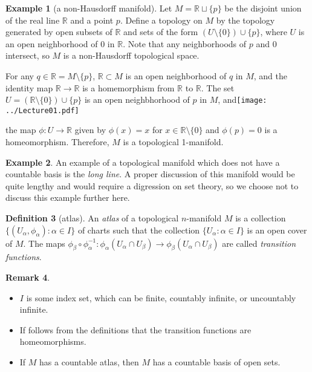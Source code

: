 \documentclass{amsart}
\numberwithin{equation}{section}
\newcommand{\bR}{\mathbb{R}}
\theoremstyle{definition}
\newtheorem{definition}{Definition} [section]
\newtheorem{example}[definition]{Example}
\newtheorem{remark}[definition]{Remark}
\theoremstyle{theorem}
\begin{document}
\begin{example}[a non-Hausdorff manifold]
Let $M = \mathbb{R} \sqcup \{p\}$ be the disjoint union of the real line $\bR$ and a point $p$. 
Define a topology on $M$ by the topology generated by open subsets of $\bR$ and sets
of the form $(U\setminus\{0\})\cup \{p\}$, where $U$ is an open neighborhood of 
$0$ in $\bR$.   Note that any neighborhoods of $p$ and   $0$ intersect, so $M$ is a non-Hausdorff topological space.

For any $q\in \bR = M\setminus\{p\}$, $\bR\subset M$ is an open neighborhood of $q$ in $M$, and 
the identity map $\bR\to \bR$ is a homemorphism from $\bR$ to $\bR$. The
set $U= (\bR\setminus \{0\})\cup \{ p\}$ is an open neighbhorhood of $p$ in $M$, and\texttt{[image: ../Lecture01.pdf]}

the map $\phi: U\to \bR$ given by $\phi(x)=x$ for $x\in \bR\setminus \{0\}$ and 
$\phi(p)=0$ is a homeomorphism. Therefore, $M$ is a topological 1-manifold.
\end{example}

\begin{example}
An example of a topological manifold which does not have a countable basis is the \emph{long line}. A proper discussion of this manifold would be quite 
lengthy and would require a digression on set theory, so we choose not to discuss this example further here. 
\end{example}

\begin{definition}[atlas]
An {\em atlas} of a topological $n$-manifold $M$ is a collection $\{(U_\alpha,\phi_\alpha) : \alpha \in I\}$ of charts such that the collection 
$\{U_\alpha : \alpha \in I\}$ is an open cover of $M$. The maps $\phi_\beta \circ \phi_\alpha^{-1} : \phi_\alpha(U_\alpha \cap U_\beta) \to \phi_\beta(U_\alpha \cap U_\beta)$ are called {\em transition functions}. 
\end{definition}

\begin{remark}
\begin{itemize}
\item $I$ is some index set, which can be finite, countably infinite, or uncountably infinite. 
\item If follows from the definitions that the transition functions are homeomorphisms. 
\item If $M$ has a countable atlas, then $M$ has a countable basis of open sets. 
\end{itemize}
\end{remark}
\end{document}
